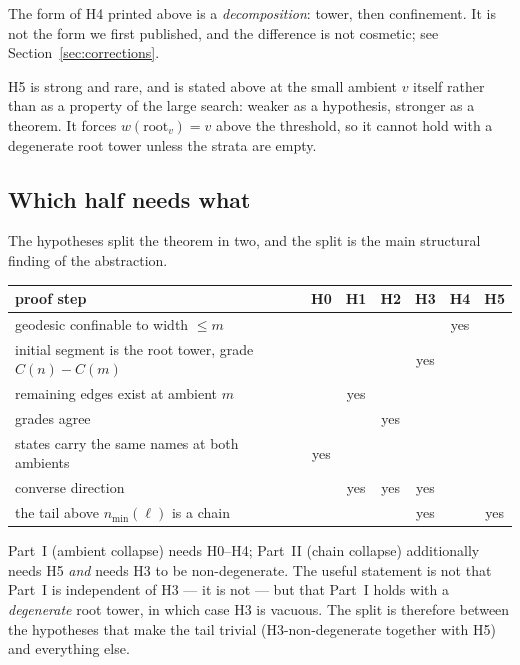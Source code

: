\documentclass[11pt,a4paper]{article}
\theoremstyle{plain}
\theoremstyle{definition}
\theoremstyle{remark}
\newcommand{\wid}{w}
\newcommand{\nmin}{n_{\min}}
\begin{document}
The form of H4 printed above is a \emph{decomposition}: tower, then confinement.
It is not the form we first published, and the difference is not cosmetic; see
Section~\ref{sec:corrections}.

H5 is strong and rare, and is stated above at the small ambient $v$ itself
rather than as a property of the large search: weaker as a hypothesis, stronger
as a theorem. It forces $\wid(\mathrm{root}_v) = v$ above the threshold, so it
cannot hold with a degenerate root tower unless the strata are empty.

\subsection{Which half needs what}

The hypotheses split the theorem in two, and the split is the main structural
finding of the abstraction.

\begin{center}
\begin{tabular}{lcccccc}
\toprule
proof step & H0 & H1 & H2 & H3 & H4 & H5 \\
\midrule
geodesic confinable to width $\le m$          &     &     &     &     & yes &     \\
initial segment is the root tower, grade $C(n)-C(m)$ &     &     &     & yes &     &     \\
remaining edges exist at ambient $m$          &     & yes &     &     &     &     \\
grades agree                                  &     &     & yes &     &     &     \\
states carry the same names at both ambients  & yes &     &     &     &     &     \\
converse direction                            &     & yes & yes & yes &     &     \\
the tail above $\nmin(\ell)$ is a chain       &     &     &     & yes &     & yes \\
\bottomrule
\end{tabular}
\end{center}

Part~I (ambient collapse) needs H0--H4; Part~II (chain collapse) additionally
needs H5 \emph{and} needs H3 to be non-degenerate. The useful statement is not
that Part~I is independent of H3 --- it is not --- but that Part~I holds with a
\emph{degenerate} root tower, in which case H3 is vacuous. The split is
therefore between the hypotheses that make the tail trivial
(H3-non-degenerate together with H5) and everything else.
\end{document}
